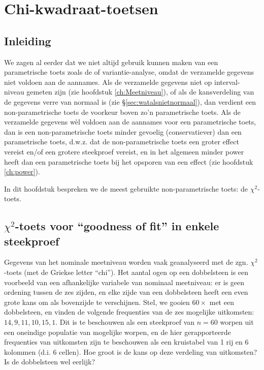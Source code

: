\documentclass[
]{book}
\begin{document}
\hypertarget{ch:chi-kwadraat-toetsen}{%
\chapter{Chi-kwadraat-toetsen}\label{ch:chi-kwadraat-toetsen}}

\hypertarget{sec:h16inleiding}{%
\section{Inleiding}\label{sec:h16inleiding}}

We zagen al eerder dat we niet altijd gebruik kunnen maken van een
parametrische toets zoals de of variantie-analyse, omdat de verzamelde
gegevens niet voldoen aan de aannames. Als de verzamelde gegevens niet
op interval-niveau gemeten zijn (zie hoofdstuk
\ref{ch:Meetniveau}), of als de kansverdeling van de gegevens
verre van normaal is (zie
§\ref{sec:watalsnietnormaal}), dan verdient een non-parametrische
toets de voorkeur boven zo'n parametrische toets. Als de verzamelde
gegevens wèl voldoen aan de aannames voor een parametrische toets, dan
is een non-parametrische toets minder gevoelig (conservatiever) dan een
parametrische toets, d.w.z. dat de non-parametrische toets een groter
effect vereist en/of een grotere steekproef vereist, en in het algemeen
minder power heeft dan een parametrische toets bij het opsporen van een
effect (zie hoofdstuk \ref{ch:power}).

In dit hoofdstuk bespreken we de meest gebruikte non-parametrische
toets: de \(\chi^2\)-toets.

\hypertarget{sec:chi2gof}{%
\section{\texorpdfstring{\(\chi^2\)-toets voor ``goodness of fit'' in enkele steekproef}{\textbackslash chi\^{}2-toets voor ``goodness of fit'' in enkele steekproef}}\label{sec:chi2gof}}

Gegevens van het nominale meetniveau worden vaak geanalyseerd met de
zgn. \(\chi^2\)-toets (met de Griekse letter ``chi''). Het aantal ogen op een dobbelsteen
is een voorbeeld van een afhankelijke variabele van nominaal meetniveau:
er is geen ordening tussen de zes zijden, en elke zijde van een
dobbelsteen heeft een even grote kans om als bovenzijde te verschijnen.
Stel, we gooien \(60\times\) met een dobbelsteen, en vinden de volgende
frequenties van de zes mogelijke uitkomsten: \(14, 9, 11, 10, 15, 1\). Dit
is te beschouwen als een steekproef van \(n=60\) worpen uit een oneindige
populatie van mogelijke worpen, en de hier gerapporteerde frequenties
van uitkomsten zijn te beschouwen als een kruistabel van 1 rij en 6
kolommen (d.i. 6 cellen). Hoe groot is de kans op deze verdeling van
uitkomsten? Is de dobbelsteen wel eerlijk?
\end{document}
